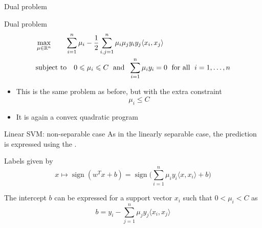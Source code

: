 \documentclass[xcolor={usenames,dvipsnames}]{beamer}
\begin{document}
  \begin{frame}{Dual problem}
  \begin{block}{Dual problem}
  \begin{align*}
      &\max_{\mu \in \mathbb{R}^n} \quad \quad \sum_{i=1}^n \mu_i - \frac 12 \sum_{i, j=1}^n \mu_i \mu_j y_i y_j \langle {x_i, x_j} \rangle \\
    &\text{subject to} \quad 0 \leqslant \mu_i \leqslant C \; \text{ and } \; 
    \sum_{i=1}^n \mu_i y_i  = 0 \; \text{ for all } \; i=1, \ldots, n
  \end{align*}
  \end{block}
  
  \begin{itemize}
    \item This is the same problem as before, but with the extra constraint 
    \begin{equation*}
      \mu_i \leq C 
    \end{equation*}
    \item It is again a convex quadratic program
  \end{itemize}
  \end{frame}



\begin{frame}{Linear SVM: non-separable case}
  As in the linearly separable case, the  prediction is expressed using the .
  \begin{block}{Labels given by}
  \begin{equation*}
    x \mapsto \mathop{sign}(w^T x + b) = \mathop{sign}\Big(  \sum_{i=1}^n \mu_i y_i 
    \langle {x, x_i} \rangle  + b \Big)
  \end{equation*}
  \end{block}

  \bigskip
  The intercept $b$ can be expressed for a support vector $x_i$ such that $0 < \mu_i < C$ as
  \begin{equation*}
    b = y_i -  \sum_{j=1}^n \mu_j y_j \langle {x_i, x_j} \rangle
  \end{equation*}
\end{frame}
\end{document}
